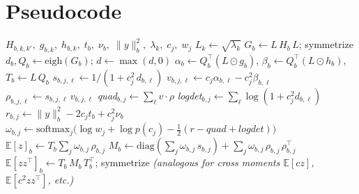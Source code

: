 \documentclass[11pt]{article}
\newcommand{\E}{\mathbb{E}}
\newcommand{\diag}{\mathrm{diag}}
\begin{document}
\appendix
\section{Pseudocode}
\label{app:pseudocode}

\begin{algorithm}[H]
\caption{Marginalized contrast posterior (spectral form)}
\label{alg:marginalized}
\begin{algorithmic}[1]
\Require $H_{b,k,k'},\; g_{b,k},\; h_{b,k},\; t_b,\; \nu_b,\;
  \|y\|^2_b,\; \lambda_k,\; c_j,\; w_j$
\State $L_k \gets \sqrt{\lambda_k}$
\Comment{$[K]$}
\State $G_{b} \gets L \, H_b \, L$; symmetrize
\Comment{$[B,K,K]$}
\State $d_b, Q_b \gets \mathrm{eigh}(G_b)$; $d \gets \max(d, 0)$
\State $\alpha_b \gets Q_b^\top (L \odot g_b)$,\quad
       $\beta_b \gets Q_b^\top (L \odot h_b)$,\quad
       $T_b \gets L \, Q_b$
  \State $s_{b,j,\ell} \gets 1/(1 + c_j^2\, d_{b,\ell})$
  \State $v_{b,j,\ell} \gets c_j \alpha_{b,\ell} - c_j^2 \beta_{b,\ell}$
  \State $\rho_{b,j,\ell} \gets s_{b,j,\ell}\, v_{b,j,\ell}$
\EndFor
\State \textit{quad}$_{b,j} \gets \sum_\ell v \cdot \rho$
\State \textit{logdet}$_{b,j} \gets \sum_\ell \log(1 + c_j^2 d_{b,\ell})$
\State $r_{b,j} \gets \|y\|^2_b - 2c_j t_b + c_j^2 \nu_b$
\State $\omega_{b,j} \gets \mathrm{softmax}_j\bigl(
  \log w_j + \log p(c_j) - \tfrac{1}{2}(r - \textit{quad} + \textit{logdet})
  \bigr)$
\State $\E[z]_b \gets T_b \sum_j \omega_{b,j}\, \rho_{b,j}$
\State $M_b \gets \diag(\sum_j \omega_{b,j}\, s_{b,j})
  + \sum_j \omega_{b,j}\, \rho_{b,j}\,\rho_{b,j}^\top$
\Comment{$[B,K,K]$}
\State $\E[zz^\top]_b \gets T_b\, M_b\, T_b^\top$; symmetrize
\State \textit{(analogous for cross moments $\E[cz]$, $\E[c^2 zz^\top]$,
  etc.)}
\end{algorithmic}
\end{algorithm}
\end{document}
